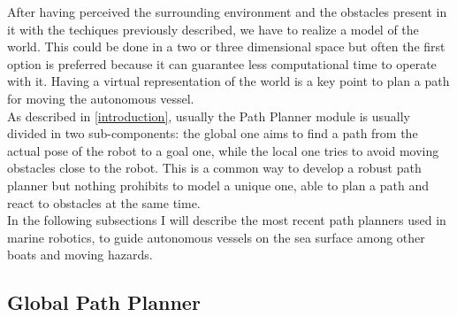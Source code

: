\documentclass[journal]{IEEEtran}
\begin{document}
      After having perceived the surrounding environment and the obstacles present in it with the techiques previously described, we have to realize a model of the world. This could be done in a two or three dimensional space but often the first option is preferred because it can guarantee less computational time to operate with it. Having a virtual representation of the world is a key point to plan a path for moving the autonomous vessel.\\
      As described in \ref{introduction}, usually the Path Planner module is usually divided in two sub-components: the global one aims to find a path from the actual pose of the robot to a goal one, while the local one tries to avoid moving obstacles close to the robot. This is a common way to develop a robust path planner but nothing prohibits to model a unique one, able to plan a path and react to obstacles at the same time.\\
      \indent In the following subsections I will describe the most recent path planners used in marine robotics, to guide autonomous vessels on the sea surface among other boats and moving hazards.

        \subsection{Global Path Planner} \label{gpp}
\end{document}
